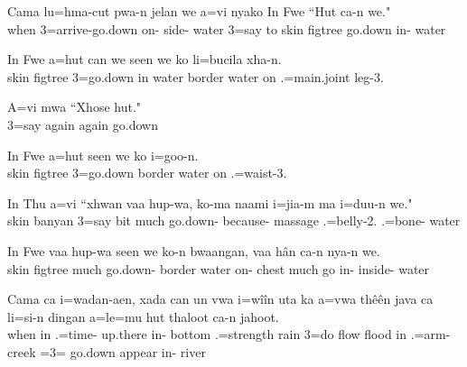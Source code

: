 \ea
\gll Cama lu=hma-cut pwa-n jelan we a=vi nyako In Fwe ``Hut ca-n we."\\ when 3=arrive-go.down on- side- water 3=say to skin figtree go.down in- water\\ 
\glt {}
\z

\ea
\gll In Fwe a=hut can we seen we ko li=bucila xha-n.\\ skin figtree 3=go.down in water border water on .=main.joint leg-3.\\ \glt  {}
\z

\ea
\gll A=vi mwa ``Xhose hut."\\ 3=say again again go.down\\ \glt  {}
\z

\ea
\gll In Fwe a=hut seen we ko i=goo-n.\\ skin figtree 3=go.down border water on .=waist-3.\\ \glt  {}
\z

\ea
\gll In Thu a=vi ``xhwan vaa hup-wa, ko-ma naami i=jia-m ma i=duu-n we."\\ skin banyan 3=say bit much go.down- because- massage .=belly-2.  .=bone- water\\ \glt {}
\z

\ea
\gll In Fwe vaa hup-wa seen we ko-n bwaangan, vaa hân ca-n nya-n we.\\ skin figtree much go.down- border water on- chest much go in- inside- water\\ \glt {}
\z

\ea
\gll Cama ca i=wadan-aen, xada can un vwa i=wîîn uta ka a=vwa thêên java ca li=si-n dingan a=le=mu hut thaloot ca-n jahoot.\\  when in .=time- up.there in- bottom  .=strength rain  3=do flow flood in .=arm- creek =3= go.down appear in- river\\ 
\glt  {} 
\z

